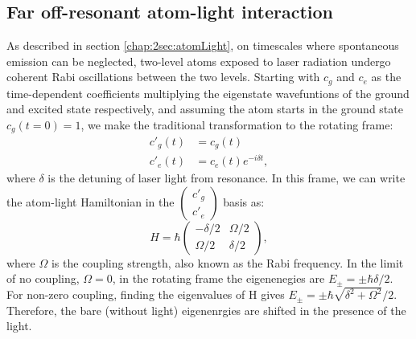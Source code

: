 \subsection{Far off-resonant atom-light interaction}
	As described in section \ref{chap:2sec:atomLight}, on timescales where spontaneous emission can be neglected, two-level atoms exposed to laser radiation undergo coherent Rabi oscillations between the two levels. Starting with $c_g$ and $c_e$ as the time-dependent coefficients multiplying the eigenstate wavefuntions of the ground and excited state respectively, and assuming the atom starts in the ground state $c_g(t=0)=1$, we make the traditional transformation to the rotating frame:
\begin{align}
c'_g(t) & = c_g(t)\\
c'_e(t) & = c_e(t) e^{-i\delta t}, 
\end{align}
where $\delta$ is the detuning of laser light from resonance. In this frame, we can write the atom-light Hamiltonian in the $\begin{pmatrix} c'_g \\ c'_e \end{pmatrix}$ basis as:
\begin{equation}
H = \hbar \begin{pmatrix} -\delta/2 & \Omega/2 \\ \Omega/2 & \delta/2 \end{pmatrix},
\end{equation}
where $\Omega$ is the coupling strength, also known as the Rabi frequency. In the limit of no coupling, $\Omega = 0$, in the rotating frame the eigenenegies are $E_{\pm} = \pm \hbar \delta/2$. For non-zero coupling, finding the eigenvalues of H gives $E_{\pm} = \pm \hbar \sqrt{\delta^2 + \Omega^2}/2$. Therefore, the bare (without light) eigenenrgies are shifted in the presence of the light. 

